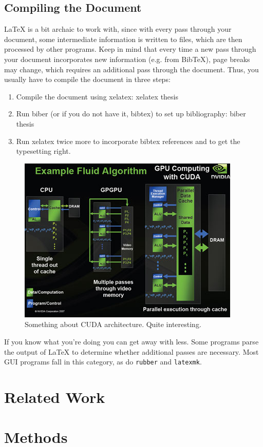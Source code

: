 \documentclass[runningheads,a4paper]{llncs}
\begin{document}
\subsection{Compiling the Document}
\LaTeX{}  is  a bit  archaic  to  work  with,  since with  every  pass 
through  your document,  some intermediate  information is  written to 
files,  which are  then processed  by  other programs.   Keep in  mind 
that  every time a  new  pass through  your  document incorporates  new 
information (e.g. from BibTeX), page breaks may change, which requires
an  additional pass  through the  document. Thus, you  usually have  to
compile the document in three steps:
\begin{enumerate}
    \item Compile the document using xelatex: xelatex thesis
    \item Run biber  (or if  you do  not have  it, bibtex)  to set  up
          bibliography: biber thesis
    \item Run xelatex  twice more to incorporate  bibtex references and
          to get the typesetting right.
\end{enumerate}


\begin{figure}[tbp]
    \centering
    \includegraphics[width=.5\linewidth]{pic/cuda.jpg}
    \caption{Something about CUDA architecture. Quite interesting.}
    \label{fig:cuda}
\end{figure}

If  you know  what  you're doing  you  can get  away  with less.   Some
programs parse the  output of \LaTeX{} to  determine whether additional
passes are necessary.  Most GUI programs fall in this category, as do
\verb+rubber+ and \verb+latexmk+.

\section{Related Work}


\section{Methods}
\end{document}
